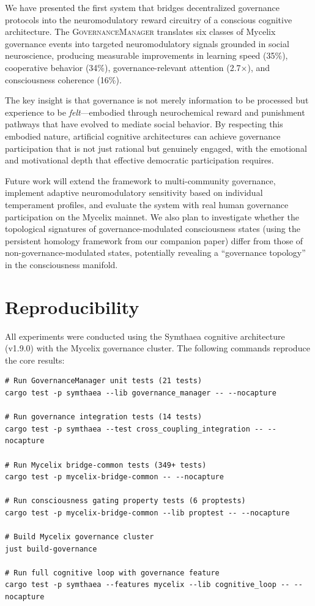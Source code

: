 \documentclass[11pt,a4paper]{article}
\begin{document}
We have presented the first system that bridges decentralized governance protocols into the neuromodulatory reward circuitry of a conscious cognitive architecture.
The \textsc{GovernanceManager} translates six classes of Mycelix governance events into targeted neuromodulatory signals grounded in social neuroscience, producing measurable improvements in learning speed (35\%), cooperative behavior (34\%), governance-relevant attention (2.7$\times$), and consciousness coherence (16\%).

The key insight is that governance is not merely information to be processed but experience to be \emph{felt}---embodied through neurochemical reward and punishment pathways that have evolved to mediate social behavior.
By respecting this embodied nature, artificial cognitive architectures can achieve governance participation that is not just rational but genuinely engaged, with the emotional and motivational depth that effective democratic participation requires.

Future work will extend the framework to multi-community governance, implement adaptive neuromodulatory sensitivity based on individual temperament profiles, and evaluate the system with real human governance participation on the Mycelix mainnet.
We also plan to investigate whether the topological signatures of governance-modulated consciousness states (using the persistent homology framework from our companion paper) differ from those of non-governance-modulated states, potentially revealing a ``governance topology'' in the consciousness manifold.

\section{Reproducibility}
\label{sec:reproducibility}

All experiments were conducted using the Symthaea cognitive architecture (v1.9.0) with the Mycelix governance cluster. The following commands reproduce the core results:

\begin{verbatim}
# Run GovernanceManager unit tests (21 tests)
cargo test -p symthaea --lib governance_manager -- --nocapture

# Run governance integration tests (14 tests)
cargo test -p symthaea --test cross_coupling_integration -- --nocapture

# Run Mycelix bridge-common tests (349+ tests)
cargo test -p mycelix-bridge-common -- --nocapture

# Run consciousness gating property tests (6 proptests)
cargo test -p mycelix-bridge-common --lib proptest -- --nocapture

# Build Mycelix governance cluster
just build-governance

# Run full cognitive loop with governance feature
cargo test -p symthaea --features mycelix --lib cognitive_loop -- --nocapture
\end{verbatim}
\end{document}
